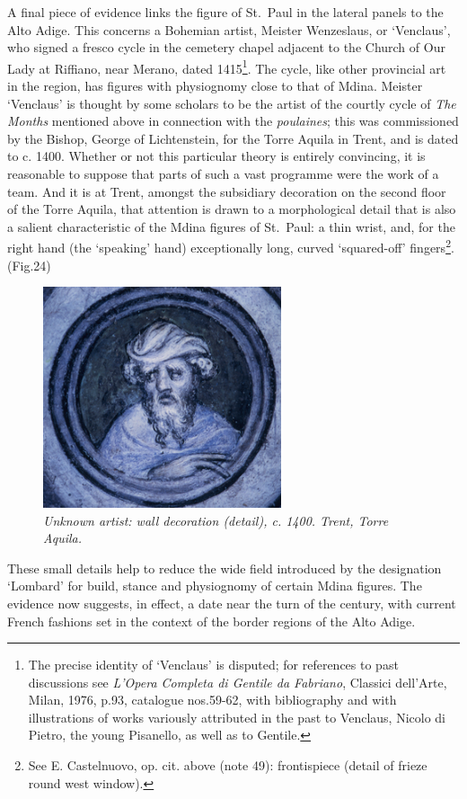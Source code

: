 \documentclass[a4paper,12pt]{article}
\begin{document}
A final piece of evidence links the figure of St.~Paul in the lateral
panels to the Alto Adige.  This concerns a Bohemian artist, Meister
Wenzeslaus, or `Venclaus', who signed a fresco cycle in the cemetery
chapel adjacent to the Church of Our Lady at Riffiano, near Merano,
dated 1415\footnote{The precise identity of `Venclaus' is disputed;
for references to past discussions see \textit{L'Opera Completa di
Gentile da Fabriano}, Classici dell'Arte, Milan, 1976, p.93, catalogue
nos.59-62, with bibliography and with illustrations of works variously
attributed in the past to Venclaus, Nicolo di Pietro, the young
Pisanello, as well as to Gentile.}.  The cycle, like other provincial
art in the region, has figures with physiognomy close to that of
Mdina.  Meister `Venclaus' is thought by some scholars to be the
artist of the courtly cycle of \textit{The Months} mentioned above in
connection with the \textit{poulaines}; this was commissioned by the
Bishop, George of Lichtenstein, for the Torre Aquila in Trent, and is
dated to c. 1400.  Whether or not this particular theory is entirely
convincing, it is reasonable to suppose that parts of such a vast
programme were the work of a team.  And it is at Trent, amongst the
subsidiary decoration on the second floor of the Torre Aquila, that
attention is drawn to a morphological detail that is also a salient
characteristic of the Mdina figures of St.~Paul: a thin wrist, and,
for the right hand (the `speaking' hand) exceptionally long, curved
`squared-off' fingers\footnote{See E. Castelnuovo, op. cit. above
(note 49): frontispiece (detail of frieze round west
window).}. (Fig.24) 
\begin{figure}[htbp]
\centering
\includegraphics[width=7cm]{pics/fig24.png}
\caption[Unknown artist: wall decoration (detail), c. 1400] 
{\it Unknown artist: wall decoration (detail), c. 1400.  Trent, Torre
Aquila.}
\end{figure}
These small details help to reduce the wide field
introduced by the designation `Lombard' for build, stance and
physiognomy of certain Mdina figures. The evidence now suggests, in
effect, a date near the turn of the century, with current French
fashions set in the context of the border regions of the Alto Adige.
\end{document}
